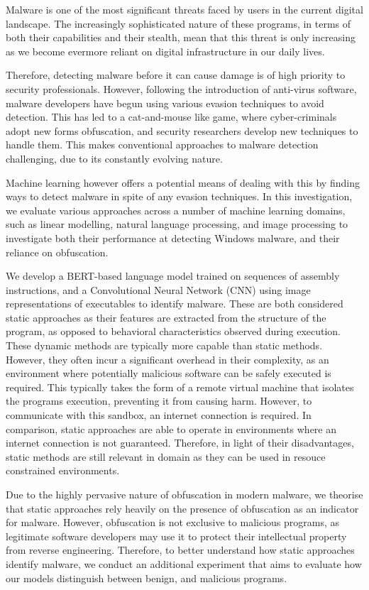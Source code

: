\documentclass[main.tex]{subfiles}
\begin{document}
\noindent
Malware is one of the most significant threats faced by users in the current digital landscape. The increasingly sophisticated nature of these programs, in terms of both their capabilities and their stealth, mean that this threat is only increasing as we become evermore reliant on digital infrastructure in our daily lives. 

Therefore, detecting malware before it can cause damage is of high priority to security professionals. However, following the introduction of anti-virus software, malware developers have begun using various evasion techniques to avoid detection. This has led to a cat-and-mouse like game, where cyber-criminals adopt new forms obfuscation, and security researchers develop new techniques to handle them. This makes conventional approaches to malware detection challenging, due to its constantly evolving nature. 

Machine learning however offers a potential means of dealing with this by finding ways to detect malware in spite of any evasion techniques. In this investigation, we evaluate various approaches across a number of machine learning domains, such as linear modelling, natural language processing, and image processing to investigate both their performance at detecting Windows malware, and their reliance on obfuscation. 

We develop a BERT-based language model trained on sequences of assembly instructions, and a Convolutional Neural Network (CNN) using image representations of executables to identify malware. These are both considered static approaches as their features are extracted from the structure of the program, as opposed to behavioral characteristics observed during execution. These dynamic methods are typically more capable than static methods. However, they often incur a significant overhead in their complexity, as an environment where potentially malicious software can be safely executed is required. This typically takes the form of a remote virtual machine that isolates the programs execution, preventing it from causing harm. However, to communicate with this sandbox, an internet connection is required. In comparison, static approaches are able to operate in environments where an internet connection is not guaranteed. Therefore, in light of their disadvantages, static methods are still relevant in domain as they can be used in resouce constrained environments. 

Due to the highly pervasive nature of obfuscation in modern malware, we theorise that static approaches rely heavily on the presence of obfuscation as an indicator for malware. However, obfuscation is not exclusive to malicious programs, as legitimate software developers may use it to protect their intellectual property from reverse engineering. Therefore, to better understand how static approaches identify malware, we conduct an additional experiment that aims to evaluate how our models distinguish between benign, and malicious programs. 
\end{document}
